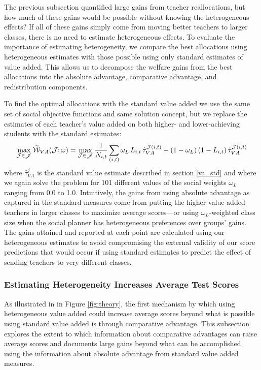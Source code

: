 \documentclass[12pt]{article}
\theoremstyle{definition}
\theoremstyle{definition}
\theoremstyle{definition}
\theoremstyle{definition}
\begin{document}
The previous subsection quantified large gains from teacher reallocations, but how much of these gains would be possible without knowing the heterogeneous effects? If all of these gains simply come from moving better teachers to larger classes, there is no need to estimate heterogeneous effects. To evaluate the importance of estimating heterogeneity, we compare the best allocations using heterogeneous estimates with those possible using only standard estimates of value added. This allows us to decompose the welfare gains from the best allocations into the absolute advantage, comparative advantage, and redistribution components.

To find the optimal allocations with the standard value added we use the same set of social objective functions and same solution concept, but we replace the estimates of each teacher's value added on both higher- and lower-achieving students with the standard estimates:
\begin{equation}\label{opt2}
\max_{\mathcal{J}\in\mathscr{J}} \accentset{\sim}{\mathcal{W}}_{VA}(\mathcal{J};\omega) = \max_{\mathcal{J}\in\mathscr{J}} \frac{1}{N_{i,t}}\sum_{(i,t)} \omega_{L} \,L_{i,t} \,\hat{\tau}^{\mathcal{J}(i,t)}_{VA}  +(1-\omega_{L}) \, (1-L_{i,t}) \, \hat{\tau}^{\mathcal{J}(i,t)}_{VA}
\end{equation}\noindent where $\hat{\tau}^j_{VA}$ is the standard value estimate described in section \ref{va_std} and where we again solve the problem for 101 different values of the social weights $\omega_L$ ranging from 0.0 to 1.0.  Intuitively, the gains from using absolute advantage as captured in the standard measures come from putting the higher value-added teachers in larger classes to maximize average scores---or using $\omega_L$-weighted class size when the social planner has heterogeneous preferences over groups' gains. The gains attained and reported at each point are calculated using our heterogeneous estimates to avoid compromising the external validity of our score predictions that would occur if using standard estimates to predict the effect of sending teachers to very different classes. %

\subsubsection{Estimating Heterogeneity Increases Average Test Scores}
As illustrated in in Figure \ref{fig:theory}, the first mechanism by which using heterogeneous value added could increase average scores beyond what is possible using standard value added is through comparative advantage. This subsection explores the extent to which information about comparative advantages can raise average scores and documents large gains beyond what can be accomplished using the information about absolute advantage from standard value added measures.
\end{document}
